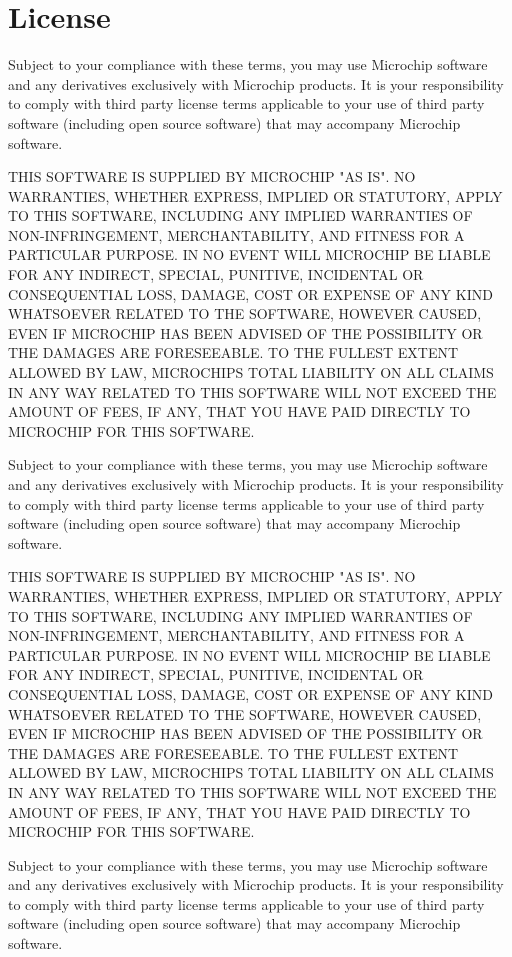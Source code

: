 \chapter{License}
\hypertarget{_license}{}\label{_license}
Subject to your compliance with these terms, you may use Microchip software and any derivatives exclusively with Microchip products. It is your responsibility to comply with third party license terms applicable to your use of third party software (including open source software) that may accompany Microchip software.

THIS SOFTWARE IS SUPPLIED BY MICROCHIP "{}\+AS IS"{}. NO WARRANTIES, WHETHER EXPRESS, IMPLIED OR STATUTORY, APPLY TO THIS SOFTWARE, INCLUDING ANY IMPLIED WARRANTIES OF NON-\/\+INFRINGEMENT, MERCHANTABILITY, AND FITNESS FOR A PARTICULAR PURPOSE. IN NO EVENT WILL MICROCHIP BE LIABLE FOR ANY INDIRECT, SPECIAL, PUNITIVE, INCIDENTAL OR CONSEQUENTIAL LOSS, DAMAGE, COST OR EXPENSE OF ANY KIND WHATSOEVER RELATED TO THE SOFTWARE, HOWEVER CAUSED, EVEN IF MICROCHIP HAS BEEN ADVISED OF THE POSSIBILITY OR THE DAMAGES ARE FORESEEABLE. TO THE FULLEST EXTENT ALLOWED BY LAW, MICROCHIP\textquotesingle{}S TOTAL LIABILITY ON ALL CLAIMS IN ANY WAY RELATED TO THIS SOFTWARE WILL NOT EXCEED THE AMOUNT OF FEES, IF ANY, THAT YOU HAVE PAID DIRECTLY TO MICROCHIP FOR THIS SOFTWARE.

Subject to your compliance with these terms, you may use Microchip software and any derivatives exclusively with Microchip products. It is your responsibility to comply with third party license terms applicable to your use of third party software (including open source software) that may accompany Microchip software.

THIS SOFTWARE IS SUPPLIED BY MICROCHIP "{}\+AS IS"{}. NO WARRANTIES, WHETHER EXPRESS, IMPLIED OR STATUTORY, APPLY TO THIS SOFTWARE, INCLUDING ANY IMPLIED WARRANTIES OF NON-\/\+INFRINGEMENT, MERCHANTABILITY, AND FITNESS FOR A PARTICULAR PURPOSE. IN NO EVENT WILL MICROCHIP BE LIABLE FOR ANY INDIRECT, SPECIAL, PUNITIVE, INCIDENTAL OR CONSEQUENTIAL LOSS, DAMAGE, COST OR EXPENSE OF ANY KIND WHATSOEVER RELATED TO THE SOFTWARE, HOWEVER CAUSED, EVEN IF MICROCHIP HAS BEEN ADVISED OF THE POSSIBILITY OR THE DAMAGES ARE FORESEEABLE. TO THE FULLEST EXTENT ALLOWED BY LAW, MICROCHIP\textquotesingle{}S TOTAL LIABILITY ON ALL CLAIMS IN ANY WAY RELATED TO THIS SOFTWARE WILL NOT EXCEED THE AMOUNT OF FEES, IF ANY, THAT YOU HAVE PAID DIRECTLY TO MICROCHIP FOR THIS SOFTWARE.

Subject to your compliance with these terms, you may use Microchip software and any derivatives exclusively with Microchip products. It is your responsibility to comply with third party license terms applicable to your use of third party software (including open source software) that may accompany Microchip software.


